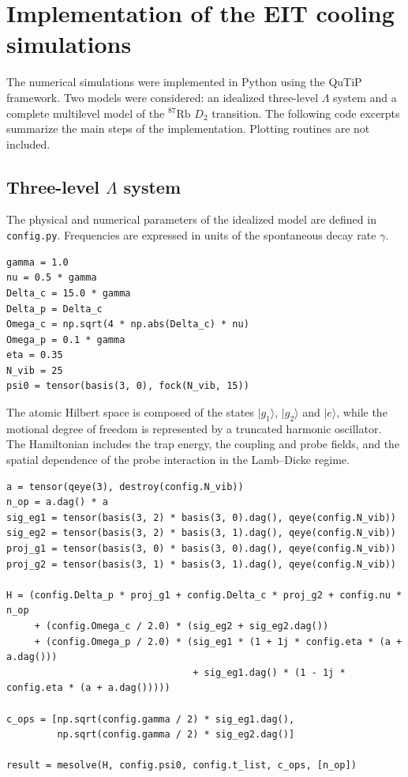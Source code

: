 \documentclass[../../thesis_main.tex]{subfiles}
\begin{document}
\appendix

\chapter{Implementation of the EIT cooling simulations}
\label{app:eit_code}

The numerical simulations were implemented in Python using the QuTiP
framework. Two models were considered: an idealized three-level
$\Lambda$ system and a complete multilevel model of the
$^{87}\mathrm{Rb}$ $D_2$ transition. The following code excerpts
summarize the main steps of the implementation. Plotting routines are
not included.

\section{Three-level $\Lambda$ system}
\label{app:three_level_code}

The physical and numerical parameters of the idealized model are defined
in \texttt{config.py}. Frequencies are expressed in units of the
spontaneous decay rate $\gamma$.

\begin{lstlisting}[caption={Main parameters of the three-level simulation.},
label={lst:three_level_config}]
gamma = 1.0
nu = 0.5 * gamma
Delta_c = 15.0 * gamma
Delta_p = Delta_c
Omega_c = np.sqrt(4 * np.abs(Delta_c) * nu)
Omega_p = 0.1 * gamma
eta = 0.35
N_vib = 25
psi0 = tensor(basis(3, 0), fock(N_vib, 15))
\end{lstlisting}

The atomic Hilbert space is composed of the states
$\lvert g_1\rangle$, $\lvert g_2\rangle$ and $\lvert e\rangle$, while
the motional degree of freedom is represented by a truncated harmonic
oscillator. The Hamiltonian includes the trap energy, the coupling and
probe fields, and the spatial dependence of the probe interaction in
the Lamb--Dicke regime.

\begin{lstlisting}[caption={Hamiltonian and collapse operators for the three-level model.},
label={lst:three_level_hamiltonian}]
a = tensor(qeye(3), destroy(config.N_vib))
n_op = a.dag() * a
sig_eg1 = tensor(basis(3, 2) * basis(3, 0).dag(), qeye(config.N_vib))
sig_eg2 = tensor(basis(3, 2) * basis(3, 1).dag(), qeye(config.N_vib))
proj_g1 = tensor(basis(3, 0) * basis(3, 0).dag(), qeye(config.N_vib))
proj_g2 = tensor(basis(3, 1) * basis(3, 1).dag(), qeye(config.N_vib))

H = (config.Delta_p * proj_g1 + config.Delta_c * proj_g2 + config.nu * n_op
     + (config.Omega_c / 2.0) * (sig_eg2 + sig_eg2.dag())
     + (config.Omega_p / 2.0) * (sig_eg1 * (1 + 1j * config.eta * (a + a.dag()))
                                 + sig_eg1.dag() * (1 - 1j * config.eta * (a + a.dag()))))

c_ops = [np.sqrt(config.gamma / 2) * sig_eg1.dag(),
         np.sqrt(config.gamma / 2) * sig_eg2.dag()]

result = mesolve(H, config.psi0, config.t_list, c_ops, [n_op])
\end{lstlisting}
\end{document}
